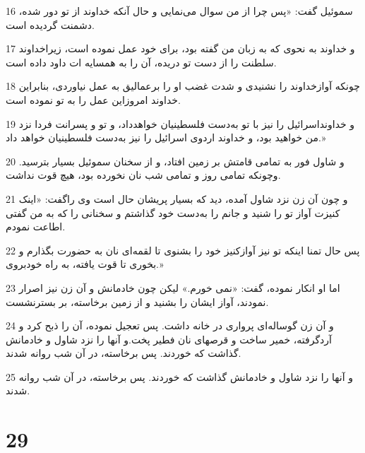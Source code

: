 \par 16 سموئیل گفت: «پس چرا از من سوال می‌نمایی و حال آنکه خداوند از تو دور شده، دشمنت گردیده است.
\par 17 و خداوند به نحوی که به زبان من گفته بود، برای خود عمل نموده است، زیراخداوند سلطنت را از دست تو دریده، آن را به همسایه ات داود داده است.
\par 18 چونکه آوازخداوند را نشنیدی و شدت غضب او را برعمالیق به عمل نیاوردی، بنابراین خداوند امروزاین عمل را به تو نموده است.
\par 19 و خداونداسرائیل را نیز با تو به‌دست فلسطینیان خواهدداد، و تو و پسرانت فردا نزد من خواهید بود، و خداوند اردوی اسرائیل را نیز به‌دست فلسطینیان خواهد داد.»
\par 20 و شاول فور به تمامی قامتش بر زمین افتاد، و از سخنان سموئیل بسیار بترسید. وچونکه تمامی روز و تمامی شب نان نخورده بود، هیچ قوت نداشت.
\par 21 و چون آن زن نزد شاول آمده، دید که بسیار پریشان حال است وی راگفت: «اینک کنیزت آواز تو را شنید و جانم را به‌دست خود گذاشتم و سخنانی را که به من گفتی اطاعت نمودم.
\par 22 پس حال تمنا اینکه تو نیز آوازکنیز خود را بشنوی تا لقمه‌ای نان به حضورت بگذارم و بخوری تا قوت یافته، به راه خودبروی.»
\par 23 اما او انکار نموده، گفت: «نمی خورم.» لیکن چون خادمانش و آن زن نیز اصرار نمودند، آواز ایشان را بشنید و از زمین برخاسته، بر بسترنشست.
\par 24 و آن زن گوساله‌ای پرواری در خانه داشت. پس تعجیل نموده، آن را ذبح کرد و آردگرفته، خمیر ساخت و قرصهای نان فطیر پخت.و آنها را نزد شاول و خادمانش گذاشت که خوردند. پس برخاسته، در آن شب روانه شدند.
\par 25 و آنها را نزد شاول و خادمانش گذاشت که خوردند. پس برخاسته، در آن شب روانه شدند.
 
\chapter{29}

